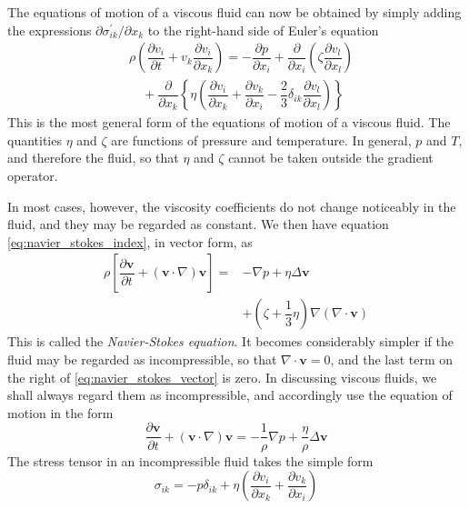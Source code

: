 \documentclass[conference]{IEEEtran}
\theoremstyle{definition}
\theoremstyle{remark}
\begin{document}
    The equations of motion of a viscous fluid can now be obtained by simply adding the expressions $\partial \sigma^\prime_{ik} / \partial x_k$ to the right-hand side of Euler's equation
    \begin{align}
        & \rho \left( \dfrac{\partial v_i}{\partial t} + v_k \dfrac{\partial v_i}{\partial x_k} \right) = -\dfrac{\partial p}{\partial x_i} + \dfrac{\partial}{\partial x_i} \left( \zeta \dfrac{\partial v_l}{\partial x_l} \right) \nonumber \\ 
        & \quad + \dfrac{\partial}{\partial x_k} \left\{ \eta \left( \dfrac{\partial v_i}{\partial x_k} + \dfrac{\partial v_k}{\partial x_i} -\dfrac23 \delta_{ik} \dfrac{\partial v_l}{\partial x_l} \right) \right\}
        \label{eq:navier_stokes_index}
    \end{align}
    This is the most general form of the equations of motion of a viscous fluid. The quantities $\eta$ and $\zeta$ are functions of pressure and temperature. In general, $p$ and $T$, and therefore the fluid, so that $\eta$ and $\zeta$ cannot be taken outside the gradient operator.

    In most cases, however, the viscosity coefficients do not change noticeably in the fluid, and they may be regarded as constant. We then have equation \ref{eq:navier_stokes_index}, in vector form, as
    \begin{align}
        \rho \left[ \dfrac{\partial \mathbf{v}}{\partial t} + (\mathbf{v} \cdot \nabla) \mathbf{v} \right] =& -\nabla p + \eta \Delta \mathbf{v} \nonumber \\
        & + (\zeta + \dfrac13 \eta) \nabla (\nabla \cdot \mathbf{v})
        \label{eq:navier_stokes_vector}
    \end{align}
    This is called the \emph{Navier-Stokes equation}. It becomes considerably simpler if the fluid may be regarded as incompressible, so that $\nabla \cdot \mathbf{v} = 0$, and the last term on the right of \ref{eq:navier_stokes_vector} is zero. In discussing viscous fluids, we shall always regard them as incompressible, and accordingly use the equation of motion in the form
    \begin{equation}
        \dfrac{\partial \mathbf{v}}{\partial t} + (\mathbf{v} \cdot \nabla) \mathbf{v} = -\dfrac1\rho \nabla p + \dfrac{\eta}{\rho} \Delta \mathbf{v}
        \label{eq:ns_impressible}
    \end{equation}
    The stress tensor in an incompressible fluid takes the simple form
    \begin{equation}
        \sigma_{ik} = - p \delta_{ik} + \eta \left( \dfrac{\partial v_i}{\partial x_k} + \dfrac{\partial v_k}{\partial x_i} \right)
    \end{equation}
\end{document}
